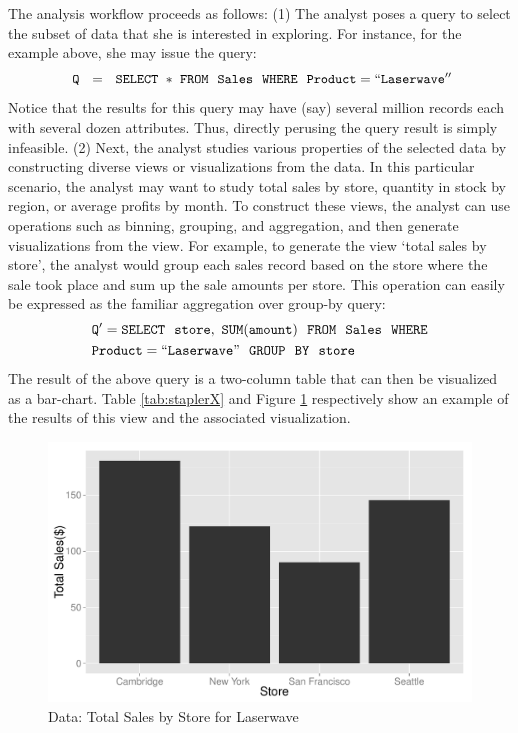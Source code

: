 The analysis workflow proceeds as follows:
(1) The analyst poses a query to select the subset of data that she is
interested in exploring.
For instance, for the example above, she may issue the query:
\noindent $${\tt \ Q \ \ = \ \ SELECT \ * \ FROM \ \  Sales \ \ WHERE \ \
Product=``Laserwave''} $$ \noindent Notice that the results for this query may
have (say) several million records each with several dozen attributes.
Thus, directly perusing the query result is simply infeasible.
(2) Next, the analyst studies various properties of the selected data by
constructing diverse views or visualizations from the data. In this particular
scenario, the analyst may want to study total sales by store, quantity in stock
by region, or average profits by month. To construct these views, the analyst
can use operations such as binning, grouping, and aggregation, and then generate
visualizations from the view. For example, to generate the view `total sales by
store', the analyst would group each sales record based on the store where the
sale took place and sum up the sale amounts per store. This operation can easily
be expressed as the familiar aggregation over group-by query:
\noindent
\begin{align*}
& \tt Q' = SELECT \ \ store,\ SUM(amount) \ \ FROM \ \  Sales \ \ WHERE \\
& \tt Product=``Laserwave" \ \ GROUP  \ \ BY \ \ store
\end{align*}
The result of the above query is a two-column table that can then be visualized
as a bar-chart. Table \ref{tab:staplerX} and Figure
\ref{fig:staplerX} respectively show an example of the results of this view and
the associated visualization.

\begin{figure}[htb]

  \centering
    \includegraphics[width=12cm]{Images/dist1.pdf}
  \caption{Data: Total Sales by Store for Laserwave}
  \label{fig:staplerX}
\end{figure}

